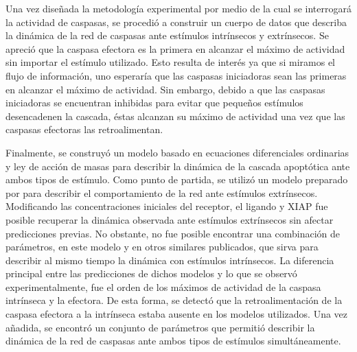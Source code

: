 Una vez diseñada la metodología experimental por medio de la cual se interrogará la actividad de caspasas, se procedió a construir un cuerpo de datos que describa la dinámica de la red de caspasas ante estímulos intrínsecos y extrínsecos. Se apreció que la caspasa efectora es la primera en alcanzar el máximo de actividad sin importar el estímulo utilizado. Esto resulta de interés ya que si miramos el flujo de información, uno esperaría que las caspasas iniciadoras sean las primeras en alcanzar el máximo de actividad. Sin embargo, debido a que las caspasas iniciadoras se encuentran inhibidas para evitar que pequeños estímulos desencadenen la cascada, éstas alcanzan su máximo de actividad una vez que las caspasas efectoras las retroalimentan.

Finalmente, se construyó un modelo basado en ecuaciones diferenciales ordinarias y ley de acción de masas para describir la dinámica de la cascada apoptótica ante ambos tipos de estímulo. Como punto de partida, se utilizó un modelo preparado por \cite{Albeck2008} para describir el comportamiento de la red ante estímulos extrínsecos. Modificando las concentraciones iniciales del receptor, el ligando y XIAP fue posible recuperar la dinámica observada ante estímulos extrínsecos sin afectar predicciones previas. No obstante, no fue posible encontrar una combinación de parámetros, en este modelo y en otros similares publicados, que sirva para describir al mismo tiempo la dinámica con estímulos intrínsecos. La diferencia principal entre las predicciones de dichos modelos y lo que se observó experimentalmente, fue el orden de los máximos de actividad de la caspasa intrínseca y la efectora. De esta forma, se detectó que la retroalimentación de la caspasa efectora a la intrínseca estaba ausente en los modelos utilizados. Una vez añadida, se encontró un conjunto de parámetros que permitió describir la dinámica de la red de caspasas ante ambos tipos de estímulos simultáneamente.

